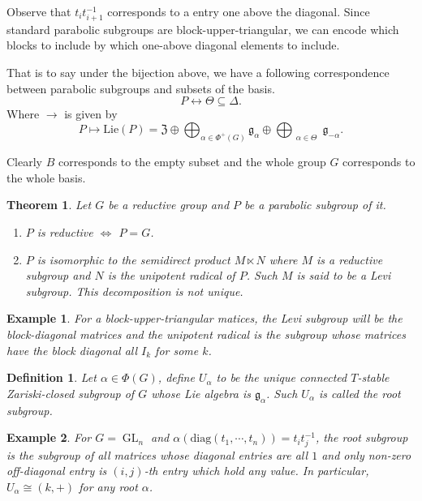 \documentclass[10pt]{article}
\newtheorem{theorem}{Theorem} [section]
\newtheorem{definition}{Definition}[section]
\newtheorem{example}{Example}[section]
\numberwithin{equation}{theorem}
\DeclareMathOperator{\GL}{GL}
\newcommand{\Lie}[0]{\mathrm{Lie}}
\newcommand{\g}[0]{\mathfrak{g}}
\begin{document}
Observe that $t_it_{i+1}^{-1}$ corresponds to a entry one above the diagonal. Since standard parabolic subgroups are block-upper-triangular, we can encode which blocks to include by which one-above diagonal elements to include. 
\par That is to say under the bijection above, we have a following correspondence between parabolic subgroups and subsets of the basis.
\begin{equation*}
    P\leftrightarrow \Theta\subseteq\Delta.
\end{equation*}
Where $\rightarrow$ is given by 
\begin{equation*}
    P\mapsto \Lie(P) = \mathfrak{Z}\oplus\bigoplus_{\alpha\in\Phi^+(G)}\g_\alpha\oplus\bigoplus_{\substack{\alpha\in\Theta}}\g_{-\alpha}.
\end{equation*}

Clearly $B$ corresponds to the empty subset and the whole group $G$ corresponds to the whole basis.

\begin{theorem}
    Let $G$ be a reductive group and $P$ be a parabolic subgroup of it. 
    \begin{enumerate}[1. ]
        \item $P$ is reductive $\iff$ $P=G$.
        \item $P$ is isomorphic to the semidirect product $M\ltimes N$ where $M$ is a reductive subgroup and $N$ is the unipotent radical of $P$. Such $M$ is said to be a Levi subgroup. This decomposition is not unique.
    \end{enumerate}
\end{theorem}

\begin{example}
    For a block-upper-triangular matices, the Levi subgroup will be the block-diagonal matrices and the unipotent radical is the subgroup whose matrices have the block diagonal all $I_k$ for some $k$.
\end{example}

\begin{definition}
    Let $\alpha\in\Phi(G)$, define $U_\alpha$ to be the unique connected $T$-stable Zariski-closed subgroup of $G$ whose Lie algebra is $\g_\alpha$. Such $U_\alpha$ is called the root subgroup.
\end{definition}

\begin{example}
    For $G=\GL_n$ and $\alpha(\mathrm{diag}(t_1,\cdots,t_n)) = t_it_j^{-1}$, the root subgroup is the subgroup of all matrices whose diagonal entries are all $1$ and only non-zero off-diagonal entry is $(i,j)$-th entry which hold any value. In particular, $U_\alpha \cong (k,+)$ for any root $\alpha$.
\end{example}
\end{document}
